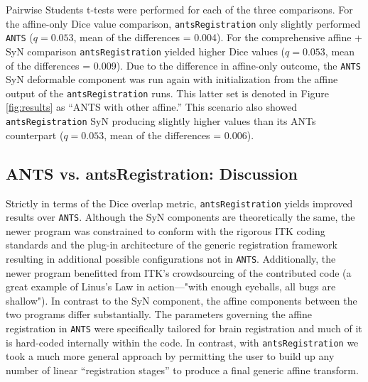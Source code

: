 \documentclass[final,5p,times,twocolumn]{elsarticle}
\begin{document}
Pairwise Students t-tests  were performed for each of the three
comparisons.
For the affine-only Dice value comparison, \verb#antsRegistration# 
only slightly  performed \verb#ANTS# ($q = 0.053$, mean of the 
differences = 0.004).  For the comprehensive affine + SyN comparison
\verb#antsRegistration# yielded higher Dice values ($q = 0.053$, 
mean of the differences = 0.009).
Due to the difference in affine-only outcome, the \verb#ANTS# 
SyN deformable component was run again with initialization from
the affine output of the \verb#antsRegistration# runs.  This
latter set is denoted in Figure \ref{fig:results} as ``ANTS with
other affine.''  This scenario also showed \verb#antsRegistration# SyN 
producing slightly higher values than its ANTs counterpart 
($q = 0.053$, mean of the differences = 0.006).



\subsection{ANTS vs. antsRegistration:  Discussion}
Strictly in terms of the Dice overlap metric, \verb#antsRegistration# yields
improved results over \verb#ANTS#.  Although the  SyN  components are theoretically
the same,  the newer program was constrained to conform
with the rigorous ITK coding standards and the plug-in architecture of
the generic registration framework resulting in additional possible
configurations not in \verb#ANTS#. Additionally, the newer program benefitted
from ITK's crowdsourcing of the contributed code (a great example of Linus's Law
in action---"with enough eyeballs, all bugs are shallow").  In contrast to the
SyN component, the affine components between the two programs differ substantially.
The parameters governing the affine registration in \verb#ANTS# were specifically 
tailored for brain registration and much of it is hard-coded internally within the
code.  In contrast, with \verb#antsRegistration# we took a much more general approach
by permitting the user to build up any number of linear ``registration stages'' 
to produce a final generic affine transform.
\end{document}
